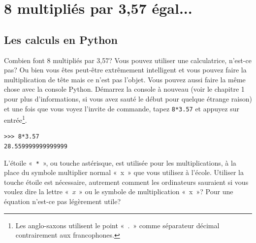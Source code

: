 

\chapter{8 multipliés par 3,57 égal...\label{chap:8}}
\section{Les calculs en Python}
Combien font 8 multipliés par 3,57? Vous pouvez utiliser une calculatrice, n'est-ce pas? 
Ou bien vous êtes peut-être extrêmement intelligent et vous pouvez faire la multiplication de tête mais ce n'est pas l'objet. 
Vous pouvez aussi faire la même chose avec la console Python.
Démarrez la console à nouveau (voir le chapitre 1 pour plus d'informations, si vous avez sauté le début pour quelque étrange raison) et une fois que vous voyez l'invite de commande, tapez \verb+8*3.57+ et appuyez sur entrée\footnote{Les anglo-saxons utilisent le point «~.~» comme séparateur décimal contrairement aux francophones.}.

\begin{Verbatim}[frame=single,rulecolor=\color{mbleu},label=à taper]
>>> 8*3.57
28.559999999999999
\end{Verbatim}

\setsansfont[Mapping=tex-text]{Linux Biolinum O}
L'étoile «~\verb+*+~», ou touche astérisque, est utilisée pour les multiplications,
à la place du symbole multiplier normal «~\textsf{x}~» que vous utilisez à l'école.
Utiliser la touche étoile est nécessaire, autrement comment les ordinateurs sauraient si vous voulez dire la lettre «~\emph{x}~» ou le symbole de multiplication «~\textsf{x}~»? Pour une équation n'est-ce pas légèrement utile?

